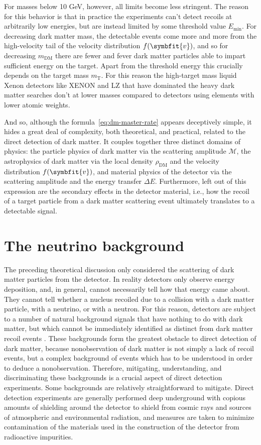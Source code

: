 \documentclass[b5paper, 10pt, twoside]{book}
\renewcommand{\vec}[1]{\symbfit{#1}}
\begin{document}
For masses below 10 GeV, however, all limits become less stringent. The reason for this behavior is that in practice the experiments can't detect recoils at arbitrarily low energies, but are instead limited by some threshold value $E_\text{min}$. For decreasing dark matter mass, the detectable events come more and more from the high-velocity tail of the velocity distribution $f(\vec{v})$, and so for decreasing $m_\text{DM}$ there are fewer and fever dark matter particles able to impart sufficient energy on the target. Apart from the threshold energy this crucially depends on the target mass $m_\text{T}$. For this reason the high-target mass liquid Xenon detectors like XENON and LZ that have dominated the heavy dark matter searches don't at lower masses compared to detectors using elements with lower atomic weights.

And so, although the formula~\eqref{eq:dm-master-rate} appears deceptively simple, it hides a great deal of complexity, both theoretical, and practical, related to the direct detection of dark matter. It couples together three distinct domains of physics: the particle physics of dark matter via the scattering amplitude $\mathcal{M}$, the astrophysics of dark matter via the local density $\rho_\text{DM}$ and the velocity distribution $f(\vec{v})$, and material physics of the detector via the scattering amplitude and the energy transfer $\Delta E$. Furthermore, left out of this expression are the secondary effects in the detector material, i.e., how the recoil of a target particle from a dark matter scattering event ultimately translates to a detectable signal.

\chapter{The neutrino background}
\label{chap:background}

The preceding theoretical discussion only considered the scattering of dark matter particles from the detector. In reality detectors only observe energy deposition, and, in general, cannot necessarily tell how that energy came about. They cannot tell whether a nucleus recoiled due to a collision with a dark matter particle, with a neutrino, or with a neutron. For this reason, detectors are subject to a number of natural background signals that have nothing to do with dark matter, but which cannot be immediately identified as distinct from dark matter recoil events \parencite{BaxterEtAl2022}. These backgrounds form the greatest obstacle to direct detection of dark matter, because nonobservation of dark matter is not simply a lack of recoil events, but a complex background of events which has to be understood in order to deduce a nonobservation. Therefore, mitigating, understanding, and discriminating these backgrounds is a crucial aspect of direct detection experiments. Some backgrounds are relatively straightforward to mitigate. Direct detection experiments are generally performed deep underground with copious amounts of shielding around the detector to shield from cosmic rays and sources of atmospheric and environmental radiation, and measures are taken to minimize contamination of the materials used in the construction of the detector from radioactive impurities.
\end{document}
